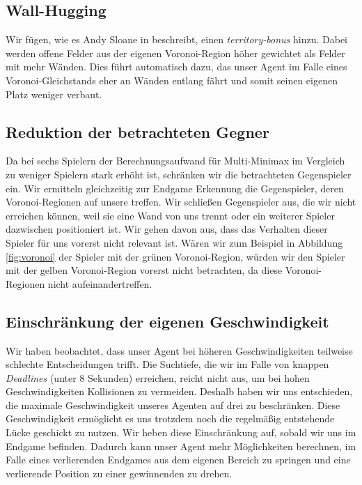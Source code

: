 \subsection{Wall-Hugging}

Wir fügen, wie es Andy Sloane in \cite{AndySloane.2010} beschreibt, einen \textit{territory-bonus} hinzu. Dabei werden offene Felder aus der eigenen Voronoi-Region höher gewichtet als Felder mit mehr Wänden. Dies führt automatisch dazu, das unser Agent im Falle eines Voronoi-Gleichstands eher an Wänden entlang fährt und somit seinen eigenen Platz weniger verbaut. 

\subsection{Reduktion der betrachteten Gegner}

Da bei sechs Spielern der Berechnungsaufwand für Multi-Minimax im Vergleich zu weniger Spielern stark erhöht ist, schränken wir die betrachteten Gegenspieler ein. Wir ermitteln gleichzeitig zur Endgame Erkennung die Gegenspieler, deren Voronoi-Regionen auf unsere treffen. Wir schließen Gegenspieler aus, die wir nicht erreichen können, weil sie eine Wand von uns trennt oder ein weiterer Spieler dazwischen positioniert ist. Wir gehen davon aus, dass das Verhalten dieser Spieler für uns vorerst nicht relevant ist. Wären wir zum Beispiel in Abbildung \ref{fig:voronoi} der Spieler mit der grünen Voronoi-Region, würden wir den Spieler mit der gelben Voronoi-Region vorerst nicht betrachten, da diese Voronoi-Regionen nicht aufeinandertreffen.

\subsection{Einschränkung der eigenen Geschwindigkeit}

Wir haben beobachtet, dass unser Agent bei höheren Geschwindigkeiten teilweise schlechte Entscheidungen trifft. Die Suchtiefe, die wir im Falle von knappen \textit{Deadlines} (unter 8 Sekunden) erreichen, reicht nicht aus, um bei hohen Geschwindigkeiten Kollisionen zu vermeiden. Deshalb haben wir uns entschieden, die maximale Geschwindigkeit unseres Agenten auf drei zu beschränken. Diese Geschwindigkeit ermöglicht es uns trotzdem noch die regelmäßig entstehende Lücke geschickt zu nutzen. Wir heben diese Einschränkung auf, sobald wir uns im Endgame befinden. Dadurch kann unser Agent mehr Möglichkeiten berechnen, im Falle eines verlierenden Endgames aus dem eigenen Bereich zu springen und eine verlierende Position zu einer gewinnenden zu drehen. 

